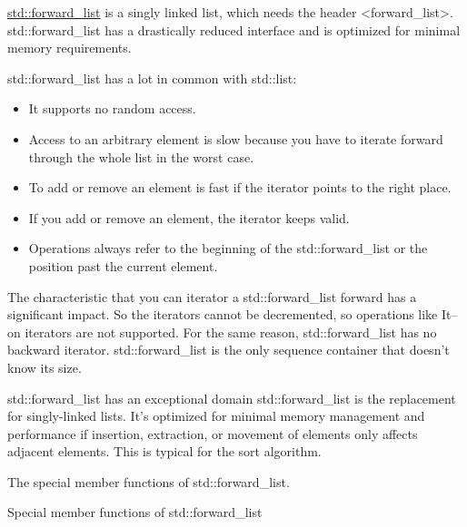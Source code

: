 

\href{http://en.cppreference.com/w/cpp/container/forward_list}{std::forward\_list} is a singly linked list, which needs the header <forward\_list>. std::forward\_list has a drastically reduced interface and is optimized for minimal memory requirements.

std::forward\_list has a lot in common with std::list:


\begin{itemize}
\item 
It supports no random access.

\item 
Access to an arbitrary element is slow because you have to iterate forward through the whole list in the worst case.

\item 
To add or remove an element is fast if the iterator points to the right place.

\item 
If you add or remove an element, the iterator keeps valid.

\item 
Operations always refer to the beginning of the std::forward\_list or the position past the current element.
\end{itemize}

The characteristic that you can iterator a std::forward\_list forward has a significant impact. So the iterators cannot be decremented, so operations like It-- on iterators are not supported. For the same reason, std::forward\_list has no backward iterator. std::forward\_list is the only sequence container that doesn’t know its size.

\begin{myTip}{std::forward\_list has an exceptional domain}
std::forward\_list is the replacement for singly-linked lists. It’s optimized for minimal memory management and performance if insertion, extraction, or movement of elements only affects adjacent elements. This is typical for the sort algorithm.
\end{myTip}

The special member functions of std::forward\_list.

\begin{center}
Special member functions of std::forward\_list
\end{center}

